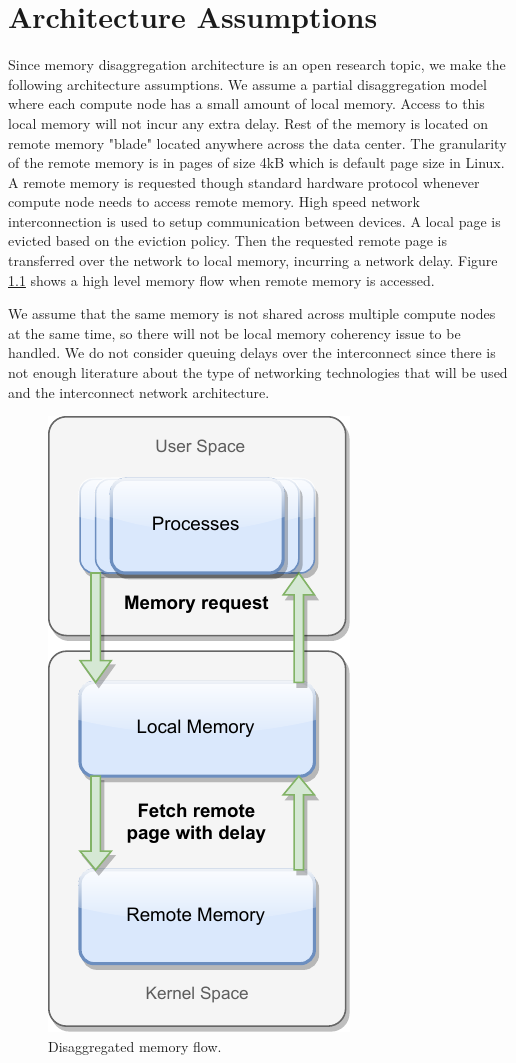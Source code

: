 
\chapter{Architecture Assumptions}
Since memory disaggregation architecture is an open research topic, we make the following architecture assumptions.
We assume a partial disaggregation model where each compute node has a small amount of local memory. Access to this local memory will not incur any extra delay. Rest of the memory is located on remote memory "blade" located anywhere across the data center. The granularity of the remote memory is in pages of size 4kB which is default page size in Linux. A remote memory is requested though standard hardware protocol whenever compute node needs to access remote memory. High speed network interconnection is used to setup communication between devices.  A local page is evicted based on the eviction policy. Then the requested remote page is transferred over the network to local memory, incurring a network delay. Figure \ref{fig:arch} shows a high level memory flow when remote memory is accessed.

We assume that the same memory is not shared across multiple compute nodes at the same time, so there will not be local memory coherency issue to be handled. We do not consider queuing delays over the interconnect since there is not enough literature about the type of networking technologies that will be used and the interconnect network architecture.

\begin{figure}[tbp]
	\centering
%	
	\includegraphics{assumption/architecture.pdf}
	\caption[Disaggregated Memory Flow]{Disaggregated memory flow.}
	\label{fig:arch} 
\end{figure}


